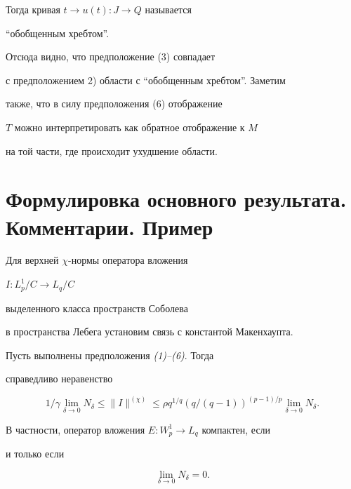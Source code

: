 Тогда кривая $t\to u(t):J\to Q$ называется


``обобщенным хребтом''.





Отсюда видно, что предположение (3) совпадает


с предположением 2) области с ``обобщенным хребтом''. Заметим


также, что в силу предположения (6) отображение


$T$ можно интерпретировать как обратное отображение к $M$


на той части, где происходит ухудшение области.





\section{Формулировка основного результата. Комментарии. Пример}





Для верхней $\chi$-нормы оператора вложения


$I:L^1_p/C\to L_q/C$


выделенного класса пространств Соболева


в пространства Лебега установим связь с константой Макенхаупта.





\begin{thmnonum} Пусть выполнены предположения {\em (1)--(6)}. Тогда


справедливо неравенство


$$


1/\gamma \lim_{\delta\to 0} N_{\delta}\le


\|I\|^{(\chi)}\le \rho q^{1/q}(q/(q-1))^{(p-1)/p}


\lim_{\delta\to 0}N_{\delta}.


$$





В частности, оператор вложения $E:W_p^1\to L_q$ компактен, если


и только если


$$


\lim_{\delta\to 0} N_{\delta}=0.


$$


\end{thmnonum}





